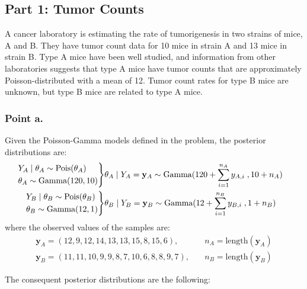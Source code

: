 \documentclass[
  11pt,
]{article}
\begin{document}
\hypertarget{part-1-tumor-counts}{%
\subsection{Part 1: Tumor Counts}\label{part-1-tumor-counts}}

A cancer laboratory is estimating the rate of tumorigenesis in two
strains of mice, A and B. They have tumor count data for 10 mice in
strain A and 13 mice in strain B. Type A mice have been well studied,
and information from other laboratories suggests that type A mice have
tumor counts that are approximately Poisson-distributed with a mean of
12. Tumor count rates for type B mice are unknown, but type B mice are
related to type A mice.

\hypertarget{point-a.-1}{%
\subsubsection{Point a.}\label{point-a.-1}}

Given the Poisson-Gamma models defined in the problem, the posterior
distributions are: \begin{align*}
    \begin{rcases}
    Y_A \; | \; \theta_A \sim \text{Pois}(\theta_A) \\
    \theta_A \sim \text{Gamma}(120, 10)
    \end{rcases}
    & \theta_A \; | \; Y_A = \mathbf{y}_A \sim \text{Gamma}(120 + \displaystyle \sum_{i=1}^{n_A} y_{A, i} \;, 10 + n_A) \\
    \begin{rcases}
    Y_B \; | \; \theta_B \sim \text{Pois}(\theta_B) \\
    \theta_B \sim \text{Gamma}(12, 1)
    \end{rcases}
    & \theta_B \; | \; Y_B = \mathbf{y}_B \sim \text{Gamma}(12 + \displaystyle \sum_{i=1}^{n_B} y_{B, i} \;, 1 + n_B)
\end{align*} where the observed values of the samples are:
\begin{align*}
     \mathbf{y}_A = (12, 9, 12, 14, 13, 13, 15, 8, 15, 6), \quad & n_A = \text{length}(\mathbf{y}_A) \\
     \mathbf{y}_B = (11, 11, 10, 9, 9, 8, 7, 10, 6, 8, 8, 9, 7), \quad & n_B = \text{length}(\mathbf{y}_B)
\end{align*}

The consequent posterior distributions are the following:

\scriptsize
\end{document}
